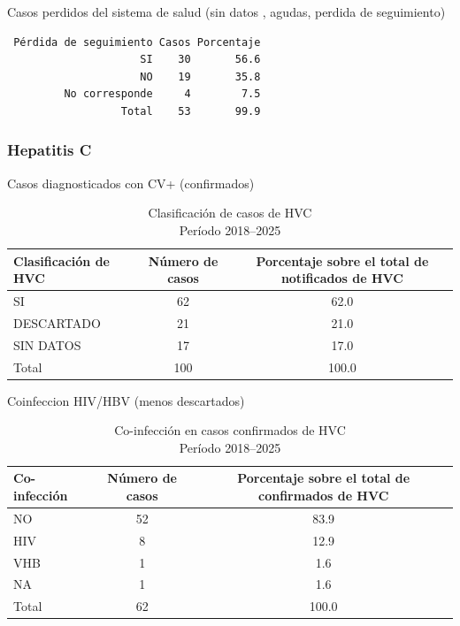 \documentclass[
  letterpaper,
  DIV=11,
  numbers=noendperiod]{scrartcl}
\begin{document}
Casos perdidos del sistema de salud (sin datos , agudas, perdida de
seguimiento)

\begin{verbatim}
 Pérdida de seguimiento Casos Porcentaje
                     SI    30       56.6
                     NO    19       35.8
         No corresponde     4        7.5
                  Total    53       99.9
\end{verbatim}

\hypertarget{hepatitis-c}{%
\subsubsection{\texorpdfstring{\textbf{Hepatitis
C}}{Hepatitis C}}\label{hepatitis-c}}

Casos diagnosticados con CV+ (confirmados)

\begin{table}
\caption*{
{\fontsize{20}{25}\selectfont  Clasificación de casos de HVC\fontsize{12}{15}\selectfont } \\ 
{\fontsize{14}{17}\selectfont  Período 2018–2025\fontsize{12}{15}\selectfont }
} 
\fontsize{12.0pt}{14.0pt}\selectfont
\begin{tabular*}{\linewidth}{@{\extracolsep{\fill}}lcc}
\toprule
Clasificación de HVC  & Número de casos & Porcentaje sobre el total de notificados de HVC \\ 
\midrule\addlinespace[2.5pt]
SI & 62 & 62.0 \\ 
DESCARTADO & 21 & 21.0 \\ 
SIN DATOS & 17 & 17.0 \\ 
Total & 100 & 100.0 \\ 
\bottomrule
\end{tabular*}
\end{table}

Coinfeccion HIV/HBV (menos descartados)

\begin{table}
\caption*{
{\fontsize{20}{25}\selectfont  Co-infección en casos confirmados de HVC\fontsize{12}{15}\selectfont } \\ 
{\fontsize{14}{17}\selectfont  Período 2018–2025\fontsize{12}{15}\selectfont }
} 
\fontsize{12.0pt}{14.0pt}\selectfont
\begin{tabular*}{\linewidth}{@{\extracolsep{\fill}}lcc}
\toprule
Co-infección  & Número de casos & Porcentaje sobre el total de confirmados de HVC \\ 
\midrule\addlinespace[2.5pt]
NO & 52 & 83.9 \\ 
HIV & 8 & 12.9 \\ 
VHB & 1 & 1.6 \\ 
NA & 1 & 1.6 \\ 
Total & 62 & 100.0 \\ 
\bottomrule
\end{tabular*}
\end{table}
\end{document}
